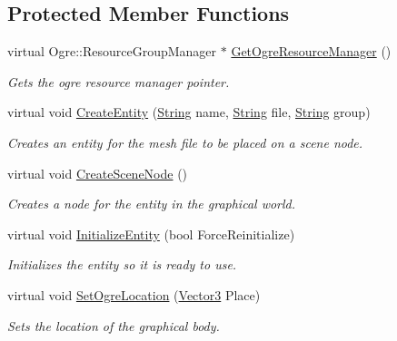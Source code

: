 \subsection*{Protected Member Functions}
\begin{DoxyCompactItemize}
\item 
virtual Ogre::ResourceGroupManager $\ast$ \hyperlink{classphys_1_1ActorBase_afa9b5a1f149182a96a7608f52847b7ed}{GetOgreResourceManager} ()
\begin{DoxyCompactList}\small\item\em Gets the ogre resource manager pointer. \item\end{DoxyCompactList}\item 
virtual void \hyperlink{classphys_1_1ActorBase_aff7dbb190fb982a43123bee3066501c4}{CreateEntity} (\hyperlink{namespacephys_aa03900411993de7fbfec4789bc1d392e}{String} name, \hyperlink{namespacephys_aa03900411993de7fbfec4789bc1d392e}{String} file, \hyperlink{namespacephys_aa03900411993de7fbfec4789bc1d392e}{String} group)
\begin{DoxyCompactList}\small\item\em Creates an entity for the mesh file to be placed on a scene node. \item\end{DoxyCompactList}\item 
virtual void \hyperlink{classphys_1_1ActorBase_a125d6f0a0b4072e64490638c074eea2d}{CreateSceneNode} ()
\begin{DoxyCompactList}\small\item\em Creates a node for the entity in the graphical world. \item\end{DoxyCompactList}\item 
virtual void \hyperlink{classphys_1_1ActorBase_aa1c797df444a498970249e9b41dc7d7e}{InitializeEntity} (bool ForceReinitialize)
\begin{DoxyCompactList}\small\item\em Initializes the entity so it is ready to use. \item\end{DoxyCompactList}\item 
virtual void \hyperlink{classphys_1_1ActorBase_a192ced7c3191f3f9d4921aad73952046}{SetOgreLocation} (\hyperlink{classphys_1_1Vector3}{Vector3} Place)
\begin{DoxyCompactList}\small\item\em Sets the location of the graphical body. \item\end{DoxyCompactList}\item 

\end{DoxyCompactItemize}

